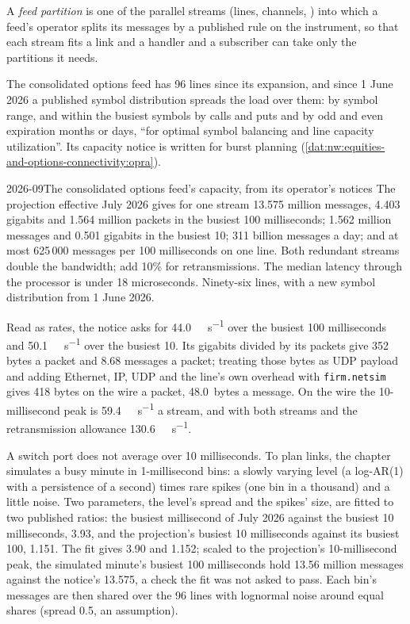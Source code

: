 \begin{definition}\label{def:nw:equities-and-options-connectivity:partition}
A \emph{feed partition} is one of the parallel streams (lines, channels, ) into which a
feed's operator splits its messages by a published rule on the instrument, so that each stream fits a link and a handler
and a subscriber can take only the partitions it needs.
\end{definition}

The consolidated options feed has 96 lines since its expansion, and since 1 June 2026 a published symbol distribution
spreads the load over them: by symbol range, and within the busiest symbols by calls and puts and by odd and even expiration
months or days, ``for optimal symbol balancing and line capacity utilization''. Its capacity notice is written for burst
planning (\cref{dat:nw:equities-and-options-connectivity:opra}).

\begin{dated}{2026-09}{The consolidated options feed's capacity, from its operator's notices}\label{dat:nw:equities-and-options-connectivity:opra}
The projection effective July 2026 gives for one stream 13.575 million messages, 4.403 gigabits and 1.564 million packets
in the busiest 100 milliseconds; 1.562 million messages and 0.501 gigabits in the busiest 10; 311 billion messages a day;
and at most 625\,000 messages per 100 milliseconds on one line. Both redundant streams double the bandwidth; add 10\% for
retransmissions. The median latency through the processor is under 18 microseconds. Ninety-six lines, with a new symbol
distribution from 1 June 2026.
\end{dated}

Read as rates, the notice asks for \qty{44.0}{\giga\bit\per\second} over the busiest 100 milliseconds and
\qty{50.1}{\giga\bit\per\second} over the busiest 10. Its gigabits divided by its packets give 352 bytes a packet and 8.68
messages a packet; treating those bytes as UDP payload and adding Ethernet, IP, UDP and the line's own overhead with
\texttt{firm.netsim} gives 418 bytes on the wire a packet, \qty{48.0}{bytes} a message. On the wire the 10-millisecond peak
is \qty{59.4}{\giga\bit\per\second} a stream, and with both streams and the retransmission allowance
\qty{130.6}{\giga\bit\per\second}.

A switch port does not average over 10 milliseconds. To plan links, the chapter simulates a busy minute in 1-millisecond
bins: a slowly varying level (a log-AR(1) with a persistence of a second) times rare spikes (one bin in a thousand) and a
little noise. Two parameters, the level's spread and the spikes' size, are fitted to two published ratios: the busiest
millisecond of July 2026 against the busiest 10 milliseconds, 3.93, and the projection's busiest 10 milliseconds against its
busiest 100, 1.151. The fit gives 3.90 and 1.152; scaled to the projection's 10-millisecond peak, the simulated minute's
busiest 100 milliseconds hold 13.56 million messages against the notice's 13.575, a check the fit was not asked to pass. Each
bin's messages are then shared over the 96 lines with lognormal noise around equal shares (spread 0.5, an assumption).

